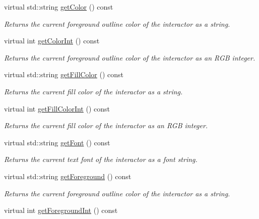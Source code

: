 \begin{DoxyCompactItemize}
virtual std\+::string \mbox{\hyperlink{classGDrawingSurface_aa061dfa488c31e18549d64363c1d0e34}{get\+Color}} () const
\begin{DoxyCompactList}\small\item\em Returns the current foreground outline color of the interactor as a string. \end{DoxyCompactList}\item 
virtual int \mbox{\hyperlink{classGDrawingSurface_a9635c7af766cdc3417f346683fa0e6c1}{get\+Color\+Int}} () const
\begin{DoxyCompactList}\small\item\em Returns the current foreground outline color of the interactor as an R\+GB integer. \end{DoxyCompactList}\item 
virtual std\+::string \mbox{\hyperlink{classGDrawingSurface_a76f6964a11fde7c78e9751be184e1a3c}{get\+Fill\+Color}} () const
\begin{DoxyCompactList}\small\item\em Returns the current fill color of the interactor as a string. \end{DoxyCompactList}\item 
virtual int \mbox{\hyperlink{classGDrawingSurface_a88f4508d9271c4b5f5b5d6b780f223d0}{get\+Fill\+Color\+Int}} () const
\begin{DoxyCompactList}\small\item\em Returns the current fill color of the interactor as an R\+GB integer. \end{DoxyCompactList}\item 
virtual std\+::string \mbox{\hyperlink{classGDrawingSurface_a894a5502900794eeb27d084c21f1d77d}{get\+Font}} () const
\begin{DoxyCompactList}\small\item\em Returns the current text font of the interactor as a font string. \end{DoxyCompactList}\item 
virtual std\+::string \mbox{\hyperlink{classGDrawingSurface_a4fa2d8b0192a3a5b4af4bbfe71194d03}{get\+Foreground}} () const
\begin{DoxyCompactList}\small\item\em Returns the current foreground outline color of the interactor as a string. \end{DoxyCompactList}\item 
virtual int \mbox{\hyperlink{classGDrawingSurface_ac3b12ab385a6ef9ae90fc879860ba726}{get\+Foreground\+Int}} () const

\end{DoxyCompactItemize}
